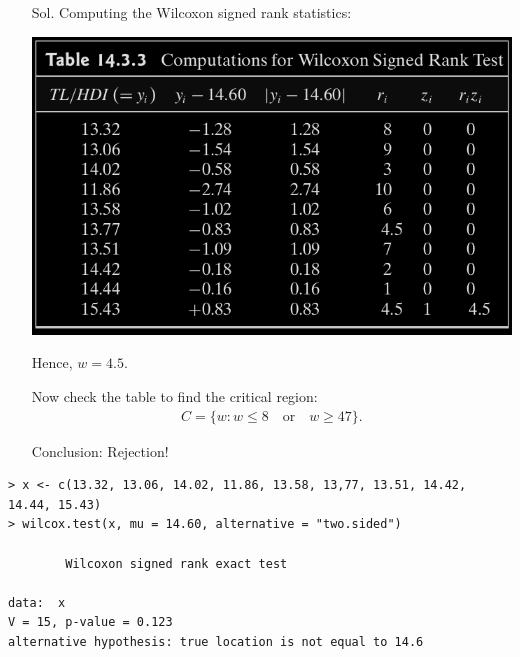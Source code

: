 \begin{frame}[fragile]
\begin{itemize}
	\item[Sol.] Computing the Wilcoxon signed rank statistics:
	\begin{center}
		\includegraphics[scale=0.25]{Codes/Table14-3-3.png}
	\end{center}
	\item[] Hence, $w=4.5$.
	\item[] Now check the table to find the critical region:
	\begin{align*}
		C = \{w: w\le 8\quad \text{or}\quad w\ge 47\}.
	\end{align*}
	\item[] Conclusion: Rejection!\myQED
\end{itemize}
\end{frame}
\begin{frame}[fragile]
\lstset{language=R}
\begin{lstlisting}
> x <- c(13.32, 13.06, 14.02, 11.86, 13.58, 13,77, 13.51, 14.42, 14.44, 15.43)
> wilcox.test(x, mu = 14.60, alternative = "two.sided")

        Wilcoxon signed rank exact test

data:  x
V = 15, p-value = 0.123
alternative hypothesis: true location is not equal to 14.6
\end{lstlisting}
%
%
%
\end{frame}
